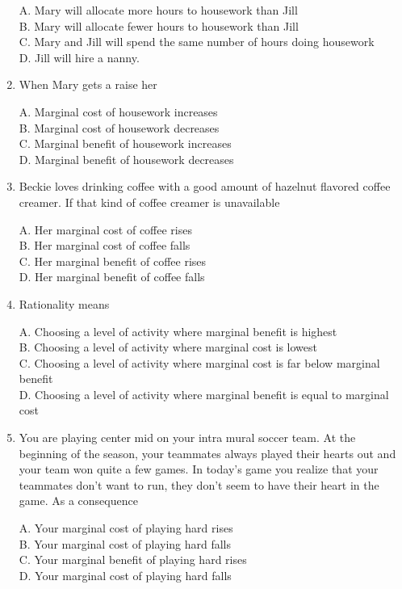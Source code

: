 \documentclass[
]{book}
\begin{document}
\begin{enumerate}
  A. Mary will allocate more hours to housework than Jill\\
  B. Mary will allocate fewer hours to housework than Jill\\
  C. Mary and Jill will spend the same number of hours doing housework\\
  D. Jill will hire a nanny.
\item
  When Mary gets a raise her

  A. Marginal cost of housework increases\\
  B. Marginal cost of housework decreases\\
  C. Marginal benefit of housework increases\\
  D. Marginal benefit of housework decreases
\item
  Beckie loves drinking coffee with a good amount of hazelnut flavored coffee creamer. If that kind of coffee creamer is unavailable

  A. Her marginal cost of coffee rises\\
  B. Her marginal cost of coffee falls\\
  C. Her marginal benefit of coffee rises\\
  D. Her marginal benefit of coffee falls
\item
  Rationality means

  A. Choosing a level of activity where marginal benefit is highest\\
  B. Choosing a level of activity where marginal cost is lowest\\
  C. Choosing a level of activity where marginal cost is far below marginal benefit\\
  D. Choosing a level of activity where marginal benefit is equal to marginal cost
\item
  You are playing center mid on your intra mural soccer team. At the beginning of the season, your teammates always played their hearts out and your team won quite a few games. In today's game you realize that your teammates don't want to run, they don't seem to have their heart in the game. As a consequence

  A. Your marginal cost of playing hard rises\\
  B. Your marginal cost of playing hard falls\\
  C. Your marginal benefit of playing hard rises\\
  D. Your marginal cost of playing hard falls
\end{enumerate}
\end{document}
